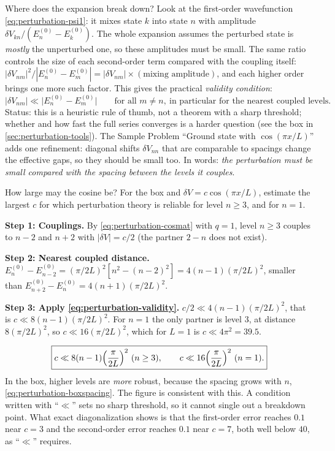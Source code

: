 Where does the expansion break down? Look at the first-order wavefunction \cref{eq:perturbation-psi1}: it mixes state $k$ into state $n$ with amplitude $\delta V_{kn}/(E_n^{(0)}-E_k^{(0)})$. The whole expansion assumes the perturbed state is \emph{mostly} the unperturbed one, so these amplitudes must be small. The same ratio controls the size of each second-order term compared with the coupling itself: $|\delta V_{nm}|^2/|E_n^{(0)}-E_m^{(0)}|=|\delta V_{nm}|\times(\text{mixing amplitude})$, and each higher order brings one more such factor. This gives the practical \emph{validity condition}:
\begin{equation}
\bigl|\delta V_{nm}\bigr|\ll\bigl|E_n^{(0)}-E_m^{(0)}\bigr|\qquad\text{for all }m\ne n,\ \text{in particular for the nearest coupled levels}.
\label{eq:perturbation-validity}
\end{equation}
Status: this is a heuristic rule of thumb, not a theorem with a sharp threshold; whether and how fast the full series converges is a harder question (see the box in \cref{sec:perturbation-tools}). The Sample Problem ``Ground state with $\cos(\pi x/L)$'' adds one refinement: diagonal shifts $\delta V_{nn}$ that are comparable to spacings change the effective gaps, so they should be small too. In words: \emph{the perturbation must be small compared with the spacing between the levels it couples}.

\begin{sample}{How large may the cosine be?}
For the box and $\delta V=c\cos(\pi x/L)$, estimate the largest $c$ for which perturbation theory is reliable for level $n\ge3$, and for $n=1$.

\textbf{Step 1: Couplings.} By \cref{eq:perturbation-cosmat} with $q=1$, level $n\ge3$ couples to $n-2$ and $n+2$ with $|\delta V|=c/2$ (the partner $2-n$ does not exist).

\textbf{Step 2: Nearest coupled distance.} $E_n^{(0)}-E_{n-2}^{(0)}=(\pi/2L)^2[n^2-(n-2)^2]=4(n-1)(\pi/2L)^2$, smaller than $E_{n+2}^{(0)}-E_n^{(0)}=4(n+1)(\pi/2L)^2$.

\textbf{Step 3: Apply \cref{eq:perturbation-validity}.} $c/2\ll4(n-1)(\pi/2L)^2$, that is $c\ll8(n-1)(\pi/2L)^2$. For $n=1$ the only partner is level 3, at distance $8(\pi/2L)^2$, so $c\ll16(\pi/2L)^2$, which for $L=1$ is $c\ll4\pi^2=39.5$.

\[
\boxed{c\ll8(n-1)\Bigl(\frac{\pi}{2L}\Bigr)^2\ (n\ge3),\qquad c\ll16\Bigl(\frac{\pi}{2L}\Bigr)^2\ (n=1).}
\]
In the box, higher levels are \emph{more} robust, because the spacing grows with $n$, \cref{eq:perturbation-boxspacing}. The figure is consistent with this. A condition written with ``$\ll$'' sets no sharp threshold, so it cannot single out a breakdown point. What exact diagonalization shows is that the first-order error reaches $0.1$ near $c=3$ and the second-order error reaches $0.1$ near $c=7$, both well below $40$, as ``$\ll$'' requires.
\end{sample}

